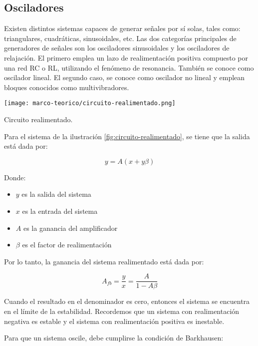 \subsection{Osciladores}

Existen distintos sistemas capaces de generar señales por sí solas, tales como:
triangulares, cuadráticas, sinusoidales, etc. Las dos categorías principales de generadores de señales son los osciladores sinusoidales y los osciladores de relajación. El primero emplea un lazo de realimentación positiva compuesto por una red RC o RL, utilizando el fenómeno de resonancia. También se conoce como oscilador lineal. El segundo caso, se conoce como oscilador no lineal y emplean bloques conocidos como multivibradores.

\begin{ilustracion}[ht]
  \centering
  \texttt{[image: marco-teorico/circuito-realimentado.png]}
  \caption{Circuito realimentado.}
  \label{fig:circuito-realimentado}
\end{ilustracion}

Para el sistema de la ilustración \ref{fig:circuito-realimentado}, se tiene que la salida está dada por:

\begin{equation}
  y = A(x + y\beta)
\end{equation}

Donde:
\begin{itemize}
  \item $y$ es la salida del sistema
  \item $x$ es la entrada del sistema 
  \item $A$ es la ganancia del amplificador
  \item $\beta$ es el factor de realimentación
\end{itemize}

Por lo tanto, la ganancia del sistema realimentado está dada por:

\begin{equation}
  A_{fb} =\frac{y}{x} = \frac{A}{1-A\beta}
  \label{eq:ganancia-realimentacion}
\end{equation}

Cuando el resultado en el denominador es cero, entonces el sistema se encuentra en el límite de la estabilidad. Recordemos que un sistema con realimentación negativa es estable y el sistema con realimentación positiva es inestable.

Para que un sistema oscile, debe cumplirse la condición de Barkhausen:

